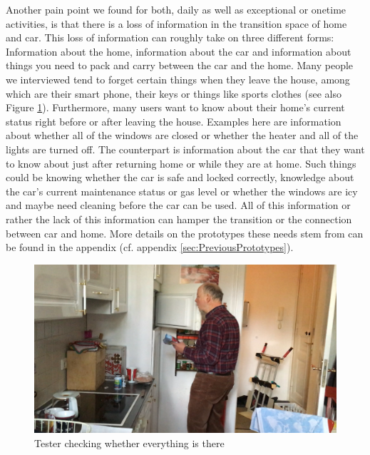 Another pain point we found for both, daily as well as exceptional or onetime activities, is that there is a loss of information in the transition space of home and car. This loss of information can roughly take on three different forms: Information about the home, information about the car and information about things you need to pack and carry between the car and the home. Many people we interviewed tend to forget certain things when they leave the house, among which are their smart phone, their keys or things like sports clothes (see also Figure \ref{fig:testerathome}). Furthermore, many users want to know about their home's current status right before or after leaving the house. Examples here are information about whether all of the windows are closed or whether the heater and all of the lights are turned off. The counterpart is information about the car that they want to know about just after returning home or while they are at home. Such things could be knowing whether the car is safe and locked correctly, knowledge about the car's current maintenance status or gas level or whether the windows are icy and maybe need cleaning before the car can be used. All of this information or rather the lack of this information can hamper the transition or the connection between car and home. More details on the prototypes these needs stem from can be found in the appendix (cf. appendix \ref{sec:PreviousPrototypes}). 

\begin{figure}[ht]
\centering
	\includegraphics[keepaspectratio, width=\textwidth]{Figures/Needfinding/TesterAtHome}
	\caption{Tester checking whether everything is there}
	\label{fig:testerathome}
\end{figure}


